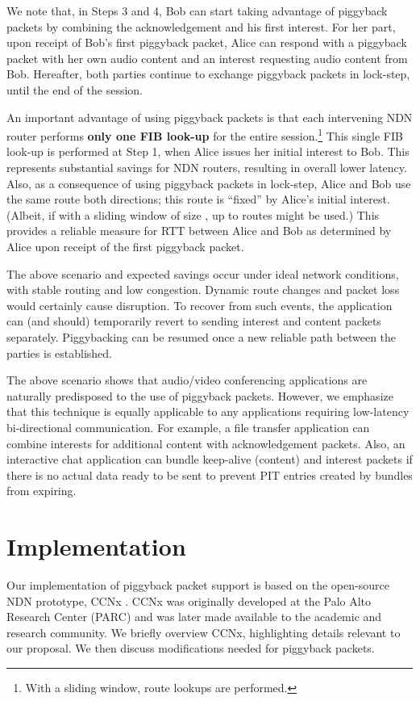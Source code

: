 \documentclass[conference]{IEEEtran}
\begin{document}
We note that, in Steps 3 and 4,  Bob can start taking advantage of piggyback packets 
by combining the acknowledgement and his first interest. For her part, upon receipt of Bob's 
first piggyback packet, Alice can respond with a piggyback packet with her own audio content 
and an interest requesting audio content from Bob. Hereafter, both parties continue to 
exchange piggyback packets in lock-step, until the end of the session. 

An important advantage of using piggyback packets is that each intervening NDN router 
performs {\bf only one FIB look-up} for the entire session.\footnote{With a 
sliding window,  
route lookups are performed.} This single FIB look-up is performed at 
Step 1, when Alice issues her initial interest to Bob. This represents substantial savings for 
NDN routers, resulting in  overall lower latency. Also, as a consequence of using 
piggyback packets in lock-step, Alice and Bob use the same route
both directions; this route is ``fixed'' by Alice's initial interest. (Albeit, if with a sliding window
of size , up to  routes might be used.) This provides a reliable measure for RTT
between Alice and Bob as determined by Alice upon receipt of the first piggyback packet.

The above scenario and expected savings occur under ideal network conditions, with 
stable routing and low congestion. Dynamic route changes and packet loss would 
certainly cause disruption. To recover  from such events, the application can (and should)
temporarily revert to sending interest and content packets separately. 
Piggybacking can be resumed once a new reliable path between the parties is established.

The above scenario shows that audio/video conferencing applications are naturally predisposed 
to the use of piggyback packets. However, we emphasize that this technique is equally applicable to 
any applications requiring low-latency bi-directional communication. For example, a file transfer 
application can combine interests for additional content with acknowledgement packets. 
Also, an interactive chat application can bundle keep-alive (content) and interest packets 
if there is no actual data ready to be sent to prevent PIT entries created by bundles from expiring.

\section{Implementation}
\label{sec:piggyback-implementation}
Our implementation of piggyback packet support is based on the open-source 
NDN prototype, CCNx \cite{CCNx}. CCNx was originally developed at the 
Palo Alto Research Center (PARC) and was later made available to the academic 
and research community. We briefly overview CCNx, highlighting details 
relevant to our proposal. We then discuss modifications needed for piggyback packets.
\end{document}
